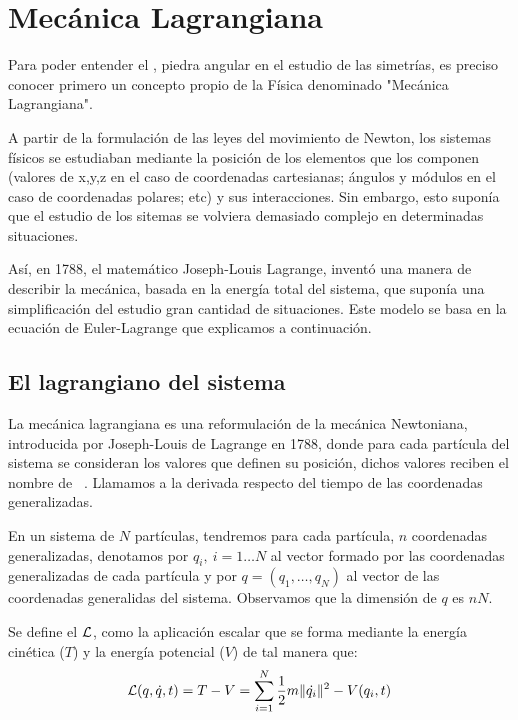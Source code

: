 \section{Mecánica Lagrangiana}
Para poder entender el  , piedra angular en el estudio de las simetrías, es preciso conocer primero un concepto propio de la Física denominado "Mecánica Lagrangiana".

A partir de la formulación de las leyes del movimiento de Newton, los sistemas físicos se estudiaban mediante la posición de los elementos que los componen (valores de x,y,z en el caso de coordenadas cartesianas; ángulos y módulos en el caso de coordenadas polares; etc) y sus interacciones. Sin embargo, esto suponía que el estudio de los sitemas se volviera demasiado complejo en determinadas situaciones.

Así, en 1788, el matemático Joseph-Louis Lagrange, inventó una manera de describir la mecánica, basada en la energía total del sistema, que suponía una simplificación del estudio gran cantidad de situaciones. Este modelo se basa en la ecuación de Euler-Lagrange que explicamos a continuación.


\subsection{El lagrangiano del sistema}\label{sec:el-lagrangiano-del-sistema}

La mecánica lagrangiana es una reformulación de la mecánica Newtoniana, introducida por Joseph-Louis de Lagrange en 1788, donde para cada partícula del sistema se consideran los valores que definen su posición, dichos valores reciben el nombre de ~\autocite{GTP}.
Llamamos  a la derivada respecto del tiempo de las coordenadas generalizadas.

En un sistema de $N$ partículas, tendremos para cada partícula, $n$ coordenadas generalizadas, denotamos por $q_i,\ i=1\dots N$ al vector formado por las coordenadas generalizadas de cada partícula y por $q=(q_1,\dots,q_N)$ al vector de las coordenadas generalidas del sistema.
Observamos que la dimensión de $q$ es $nN$.

Se define el  $\mathcal{L}$, como la aplicación escalar que se forma mediante la energía cinética ($T$) y la energía potencial ($V$) de tal manera que:
\begin{equation}
	\label{eq:lagrangiano_clasico}
	\mathcal{L}(q,\dot{q},t)=T-V=\sum\limits_{i=1}^{N} \frac{1}{2}m\|\dot{q_i}\|^2-V(q_i,t)
\end{equation}

